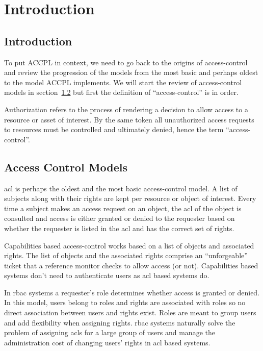 \chapter{Introduction}

\section{Introduction}

To put \ac{ACCPL} in context, we need to go back to the origins of access-control and review the progression of the models from the most basic and perhaps oldest to the model \ac{ACCPL} implements. We will start the review of access-control models in section~\ref{sec:models} but first the definition of ``access-control'' is in order.

Authorization refers to the process of rendering a decision to allow access to a resource or asset of interest. By the same token all unauthorized access requests to resources must be controlled and ultimately denied, hence the term ``access-control''. 



\section{Access Control Models}\label{sec:models}

\ac{acl} is perhaps the oldest and the most basic access-control model. A list of subjects along with their rights are kept per resource or object of interest. Every time a subject makes an access request on an object, the \ac{acl} of the object is consulted and access is either granted or denied to the requester based on whether the requester is listed in the \ac{acl} and has the correct set of rights.

Capabilities based access-control works based on a list of objects and associated rights. The list of objects and the associated rights comprise an ``unforgeable'' ticket that a reference monitor checks to allow access (or not). Capabilities based systems don't need to authenticate users as \ac{acl} based systems do.

In \ac{rbac} systems a requester's role determines whether access is granted or denied. In this model, users belong to roles and rights are associated with roles so no direct association between users and rights exist. Roles are meant to group users and add flexibility when assigning rights. \ac{rbac} systems naturally solve the problem of assigning \ac{acl}s for a large group of users and manage the administration cost of changing users' rights in \ac{acl} based systems.


